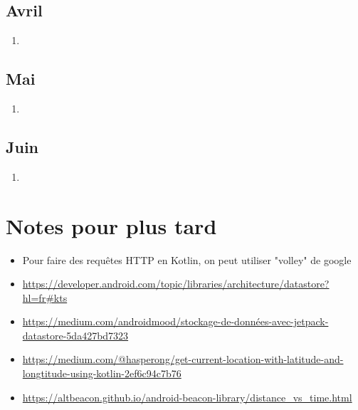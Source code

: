 \documentclass[10pt,a4paper]{book}
\begin{document}
\chapter{Avril}

\begin{enumerate}
    \item 
\end{enumerate}

\chapter{Mai}

\begin{enumerate}
    \item 
\end{enumerate}

\chapter{Juin}

\begin{enumerate}
    \item 
\end{enumerate}

\part{Notes pour plus tard}

\begin{itemize}
    \item Pour faire des requêtes HTTP en Kotlin, on peut utiliser "volley" de google
    \item \href{https://developer.android.com/topic/libraries/architecture/datastore?hl=fr\#kts}{https://developer.android.com/topic/libraries/architecture/datastore?hl=fr\#kts}
    \item \href{https://medium.com/androidmood/stockage-de-données-avec-jetpack-datastore-5da427bd7323}{https://medium.com/androidmood/stockage-de-données-avec-jetpack-datastore-5da427bd7323}
    \item \href{https://medium.com/@hasperong/get-current-location-with-latitude-and-longtitude-using-kotlin-2ef6c94c7b76}{https://medium.com/@hasperong/get-current-location-with-latitude-and-longtitude-using-kotlin-2ef6c94c7b76}
    \item \href{https://altbeacon.github.io/android-beacon-library/distance\_vs\_time.html}{https://altbeacon.github.io/android-beacon-library/distance\_vs\_time.html}
\end{itemize}
\end{document}
